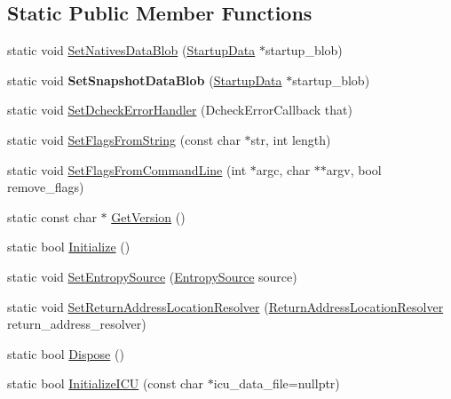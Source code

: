 \subsection*{Static Public Member Functions}
\begin{DoxyCompactItemize}
\item 
static void \mbox{\hyperlink{classv8_1_1V8_ae6a0f605e072e9e27e3666559d5c351f}{Set\+Natives\+Data\+Blob}} (\mbox{\hyperlink{classv8_1_1StartupData}{Startup\+Data}} $\ast$startup\+\_\+blob)
\item 
\mbox{\label{classv8_1_1V8_a231b3cd8e5578497ee36210c0411f14c}} 
static void {\bfseries Set\+Snapshot\+Data\+Blob} (\mbox{\hyperlink{classv8_1_1StartupData}{Startup\+Data}} $\ast$startup\+\_\+blob)
\item 
static void \mbox{\hyperlink{classv8_1_1V8_a5cbe8372ea21fcf6ae816e090e9a2d1f}{Set\+Dcheck\+Error\+Handler}} (Dcheck\+Error\+Callback that)
\item 
static void \mbox{\hyperlink{classv8_1_1V8_ab263a85e6f97ea79d944bd20bb09a95f}{Set\+Flags\+From\+String}} (const char $\ast$str, int length)
\item 
static void \mbox{\hyperlink{classv8_1_1V8_a63157ad9284ffad1c0ab62b21aadd08c}{Set\+Flags\+From\+Command\+Line}} (int $\ast$argc, char $\ast$$\ast$argv, bool remove\+\_\+flags)
\item 
static const char $\ast$ \mbox{\hyperlink{classv8_1_1V8_afcecc0e9e8b5fa17a06a93f7b5a7538d}{Get\+Version}} ()
\item 
static bool \mbox{\hyperlink{classv8_1_1V8_a40daec93ce44bdd922567fc121be9db8}{Initialize}} ()
\item 
static void \mbox{\hyperlink{classv8_1_1V8_a5331ce9c858af264f30de667c74c5a76}{Set\+Entropy\+Source}} (\mbox{\hyperlink{namespacev8_ab699f4bbbb56350e6e915682e420fcdc}{Entropy\+Source}} source)
\item 
static void \mbox{\hyperlink{classv8_1_1V8_a7a9e8a96dcb3c3d306c0061b0a8e39c8}{Set\+Return\+Address\+Location\+Resolver}} (\mbox{\hyperlink{namespacev8_a8ce54c75241be41ff6a25e9944eefd2a}{Return\+Address\+Location\+Resolver}} return\+\_\+address\+\_\+resolver)
\item 
static bool \mbox{\hyperlink{classv8_1_1V8_a566450d632c0a63770682b9da3cae08d}{Dispose}} ()
\item 
static bool \mbox{\hyperlink{classv8_1_1V8_a707f49bb9aef6d01294cd2f2f83939aa}{Initialize\+I\+CU}} (const char $\ast$icu\+\_\+data\+\_\+file=nullptr)
\item 
$$
\end{DoxyCompactItemize}
